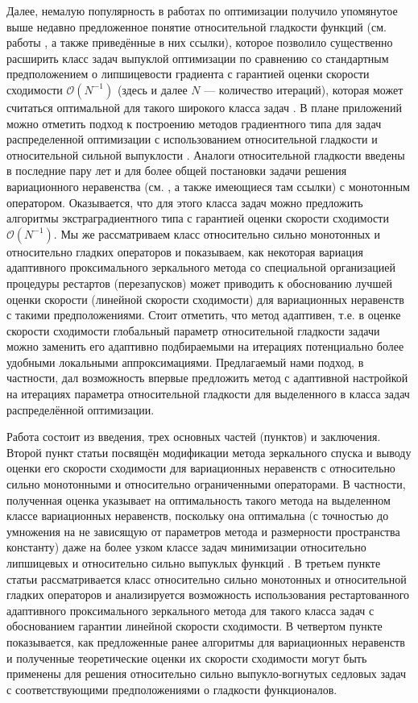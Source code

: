     Далее, немалую популярность в работах по оптимизации получило упомянутое выше недавно предложенное понятие относительной гладкости функций (см. работы \cite{Bauschke,Drag,Dragomir,Lu_Nesterov_2018}, а также приведённые в них ссылки), которое позволило существенно расширить класс задач выпуклой оптимизации по сравнению со стандартным предположением о липшицевости градиента с гарантией оценки скорости сходимости $\mathcal{O}(N^{-1})$ (здесь и далее $N$ --- количество итераций), которая может считаться оптимальной для такого широкого класса задач \cite{Dragomir}. В плане приложений можно отметить подход к построению методов градиентного типа для задач распределенной оптимизации с использованием относительной гладкости и относительной сильной выпуклости \cite{Hendr}. Аналоги относительной гладкости введены в последние пару лет и для более общей постановки задачи решения вариационного неравенства (см. \cite{Inex}, а также имеющиеся там ссылки) с монотонным оператором. Оказывается, что для этого класса задач можно предложить алгоритмы экстраградиентного типа с гарантией оценки скорости сходимости $\mathcal{O}(N^{-1})$. Мы же рассматриваем класс относительно сильно монотонных и относительно гладких операторов и показываем, как некоторая вариация адаптивного проксимального зеркального метода \cite{UMP} со специальной организацией процедуры рестартов (перезапусков) может приводить к обоснованию лучшей оценки скорости (линейной скорости сходимости) для вариационных неравенств с такими предположениями. Стоит отметить, что метод адаптивен, т.е. в оценке скорости сходимости глобальный параметр относительной гладкости задачи можно заменить его адаптивно подбираемыми на итерациях потенциально более удобными локальными аппроксимациями. Предлагаемый нами подход, в частности, дал возможность впервые предложить метод с адаптивной настройкой на итерациях параметра относительной гладкости для выделенного в \cite{Hendr} класса задач распределённой оптимизации.

    Работа состоит из введения, трех основных частей (пунктов) и заключения. Второй пункт статьи посвящён модификации метода зеркального спуска и выводу оценки его скорости сходимости для вариационных неравенств с относительно сильно монотонными и относительно ограниченными операторами. В частности, полученная оценка указывает на оптимальность такого метода на выделенном классе вариационных неравенств, поскольку она оптимальна (с точностью до умножения на не зависящую от параметров метода и размерности пространства константу) даже на более узком классе задач минимизации относительно липшицевых и относительно сильно выпуклых функций \cite{Lu_2018}. В третьем пункте статьи рассматривается класс относительно сильно монотонных и относительной гладких операторов и анализируется возможность использования рестартованного адаптивного проксимального зеркального метода для такого класса задач с обоснованием гарантии линейной скорости сходимости. В четвертом пункте показывается, как предложенные ранее алгоритмы для вариационных неравенств и полученные теоретические оценки их скорости сходимости могут быть применены для решения относительно сильно выпукло-вогнутых седловых задач с соответствующими предположениями о гладкости функционалов.

